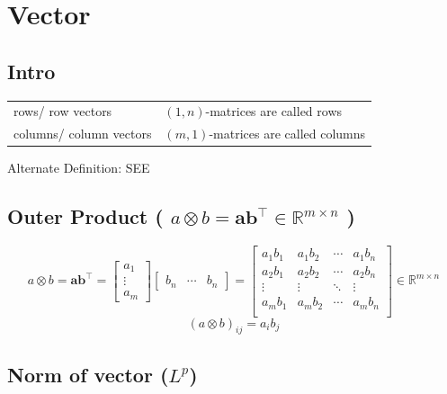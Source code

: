 \chapter{Vector \cite{mfml-1}}\label{chapter: Vector}

\section*{Intro \cite{mfml-1}}
\begin{table}[H]
    \begin{tabular}{l l}
        rows/ row vectors & $(1, n)$-matrices are called rows \\

        columns/ column vectors & $(m, 1)$-matrices are called columns \\
    \end{tabular}
\end{table}

Alternate Definition: SEE 


\section{Outer Product ( $a\otimes b= \mathbf{ab^\top} \in \mathbb{R}^{m\times n}$ ) \cite{mfml-1}} \label{vector: Outer Product}
\[
    a\otimes b= \mathbf{ab^\top} = 
    \begin{bmatrix}
        a_1\\
        \vdots\\
        a_m
    \end{bmatrix}
    \begin{bmatrix}
        b_n & \cdots & b_n
    \end{bmatrix}
    =
    \begin{bmatrix}
        a_1 b_1 & a_1 b_2 & \cdots & a_1 b_n\\
        a_2 b_1 & a_2 b_2 & \cdots & a_2 b_n\\
        \vdots & \vdots & \ddots & \vdots \\
        a_m b_1 & a_m b_2 & \cdots & a_m b_n\\
    \end{bmatrix} \in \mathbb{R}^{m\times n}
\]
\[
    (a\otimes b)_{ij} = a_i b_j
\]


\section{Norm of vector ($L^p$) \cite{dnn-deep-learning-ian}}\label{Norm of vector}

